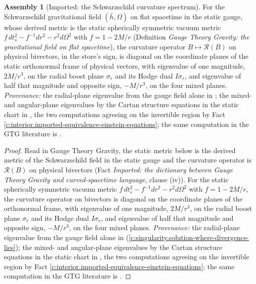 \documentclass[11pt]{article}
\theoremstyle{definition}
\newtheorem{assembled}[theorem]{Assembly}
\theoremstyle{plain}
\newcommand{\changedmark}[2]{\marginpar{\raggedright\scriptsize\color{#1}#2}}
\providecommand{\hb}{}\renewcommand{\hb}{\bar{h}}
\begin{document}
\begin{assembled}[Imported: the Schwarzschild curvature spectrum]\label{c:interior.imported-schwarzschild-curvature-spectrum}
\changedmark{gray}{reworded}
For the Schwarzschild gravitational field $(\hb, \Omega)$ on flat spacetime in the static gauge, whose derived metric is the static spherically symmetric vacuum metric $f\,dt_s^2 - f^{-1}dr^2 - r^2 d\Omega^2$ with $f = 1 - 2M/r$ (Definition \emph{Gauge Theory Gravity: the gravitational field on flat spacetime}), the curvature operator $B \mapsto \mathcal{R}(B)$ on physical bivectors, in the store's sign, is diagonal on the coordinate planes of the static orthonormal frame of physical vectors, with eigenvalue of one magnitude, $2M/r^3$, on the radial boost plane $\sigma_r$ and its Hodge dual $I\sigma_r$, and eigenvalue of half that magnitude and opposite sign, $-M/r^3$, on the four mixed planes. \emph{Provenance:} the radial-plane eigenvalue from the gauge field alone in \cite[Prop.~2.4(1)]{ButlerT5}; the mixed- and angular-plane eigenvalues by the Cartan structure equations in the static chart in \cite[App.~A]{ButlerT5}, the two computations agreeing on the invertible region by Fact \ref{c:interior.imported-equivalence-einstein-equations}; the same computation in the GTG literature is \cite[Ch.~14]{DoranLasenby2003}.
\end{assembled}
\begin{proof}
Read in Gauge Theory Gravity, the static metric below is the derived metric of the Schwarzschild field in the static gauge and the curvature operator is $\mathcal{R}(B)$ on physical bivectors (Fact \emph{Imported: the dictionary between Gauge Theory Gravity and curved-spacetime language}, clause (iv)). For the static spherically symmetric vacuum metric $f\,dt_s^2 - f^{-1}dr^2 - r^2 d\Omega^2$ with $f = 1 - 2M/r$, the curvature operator on bivectors is diagonal on the coordinate planes of the orthonormal frame, with eigenvalue of one magnitude, $2M/r^3$, on the radial boost plane $\sigma_r$ and its Hodge dual $I\sigma_r$, and eigenvalue of half that magnitude and opposite sign, $-M/r^3$, on the four mixed planes. \emph{Provenance:} the radial-plane eigenvalue from the gauge field alone in \cite[Prop.~2.4(1)]{ButlerT5} (\ref{c:singularity.solution-where-divergence-lies}); the mixed- and angular-plane eigenvalues by the Cartan structure equations in the static chart in \cite[App.~A]{ButlerT5}, the two computations agreeing on the invertible region by Fact \ref{c:interior.imported-equivalence-einstein-equations}; the same computation in the GTG literature is \cite[Ch.~14]{DoranLasenby2003}.

\end{proof}
\end{document}
